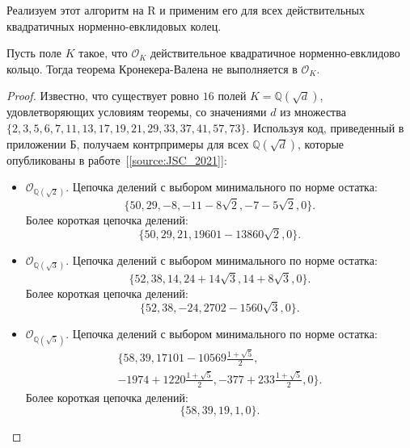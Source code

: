 \documentclass[_00_dissertation.tex]{subfiles}
\begin{document}
Реализуем этот алгоритм на R и применим его для всех действительных квадратичных норменно-евклидовых колец.

\begin{theorem}\label{theorem:kronecker}
    Пусть поле $K$ такое, что $\mathcal{O}_K$ действительное квадратичное норменно-евклидово кольцо.
    Тогда теорема Кронекера-Валена не выполняется в $\mathcal{O}_K$.
\end{theorem}
\begin{proof}
    Известно, что существует ровно $16$ полей $K = \mathbb{Q}(\sqrt{d})$, удовлетворяющих условиям теоремы, со значениями $d$ из множества $\{2, 3, 5, 6, 7, 11, 13, 17, 19, 21, 29, 33, 37, 41, 57, 73\}$.
    Используя код, приведенный в приложении Б, получаем контрпримеры для всех $\mathbb{Q}(\sqrt{d})$, которые опубликованы в работе~[\ref{source:JSC_2021}]:
    \begin{itemize}
        \item $\mathcal{O}_{\mathbb{Q}(\sqrt{2})}$.
        Цепочка делений с выбором минимального по норме остатка:
        \begin{equation*}
            \{50, 29, -8, -11-8\sqrt{2}, -7-5\sqrt{2}, 0\}.
        \end{equation*}
        Более короткая цепочка делений:
        \begin{equation*}
            \{50, 29, 21, 19601-13860\sqrt{2}, 0\}.
        \end{equation*}
    
        \item $\mathcal{O}_{\mathbb{Q}(\sqrt{3})}$.
        Цепочка делений с выбором минимального по норме остатка:
        \begin{equation*}
            \{52, 38, 14, 24+14\sqrt{3}, 14+8\sqrt{3}, 0\}.
        \end{equation*}
        Более короткая цепочка делений:
        \begin{equation*}
            \{52, 38, -24, 2702-1560\sqrt{3}, 0\}.
        \end{equation*}
    
        \item $\mathcal{O}_{\mathbb{Q}(\sqrt{5})}$.
        Цепочка делений с выбором минимального по норме остатка:
        \begin{multline*}
            \{58, 39, 17101-10569\frac{1+\sqrt{5}}{2},\\
            -1974+1220\frac{1+\sqrt{5}}{2}, -377+233\frac{1+\sqrt{5}}{2}, 0\}.
        \end{multline*}
        Более короткая цепочка делений:
        \begin{equation*}
            \{58, 39, 19, 1, 0\}.
        \end{equation*}
    

\end{itemize}
\end{proof}
\end{document}
